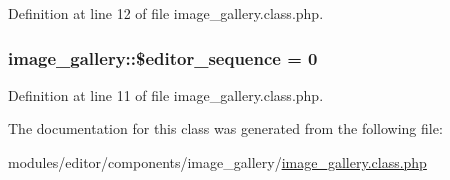 Definition at line 12 of file image\-\_\-gallery.\-class.\-php.

\hypertarget{classimage__gallery_a63124b017697df694664efada4edd0be}{
\subsubsection[{\$editor\-\_\-sequence}]{\setlength{\rightskip}{0pt plus 5cm}image\-\_\-gallery\-::\$editor\-\_\-sequence = 0}}\label{classimage__gallery_a63124b017697df694664efada4edd0be}


Definition at line 11 of file image\-\_\-gallery.\-class.\-php.



The documentation for this class was generated from the following file\-:\begin{DoxyCompactItemize}
\item 
modules/editor/components/image\-\_\-gallery/\hyperlink{image__gallery_8class_8php}{image\-\_\-gallery.\-class.\-php}\end{DoxyCompactItemize}
